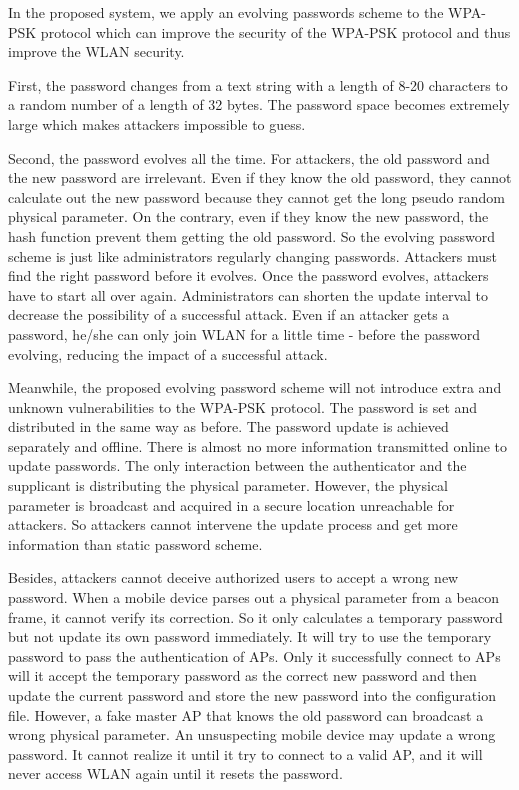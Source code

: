In the proposed system, we apply an evolving passwords scheme to the WPA-PSK protocol which can improve the security of the WPA-PSK protocol and thus improve the WLAN security. 


First, the password changes from a text string with a length of 8-20 characters to a random number of a length of 32 bytes. The password space becomes extremely large which makes attackers impossible to guess. 


Second, the password evolves all the time. For attackers, the old password and the new password are irrelevant. Even if they know the old password, they cannot calculate out the new password because they cannot get the long pseudo random physical parameter. On the contrary, even if they know the new password, the hash function prevent them getting the old password. So the evolving password scheme is just like administrators regularly changing passwords. Attackers must find the right password before it evolves. Once the password evolves, attackers have to start all over again. Administrators can shorten the update interval to decrease the possibility of a successful attack. Even if an attacker gets a password, he/she can only join WLAN for a little time - before the password evolving, reducing the impact of a successful attack. 


Meanwhile, the proposed evolving password scheme will not introduce extra and unknown vulnerabilities to the WPA-PSK protocol. The password is set and distributed in the same way as before. The password update is achieved separately and offline. There is almost no more information transmitted online to update passwords. The only interaction between the authenticator and the supplicant is distributing the physical parameter. However, the physical parameter is broadcast and acquired in a secure location unreachable for attackers. So attackers cannot intervene the update process and get more information than static password scheme. 


Besides, attackers cannot deceive authorized users to accept a wrong new password. When a mobile device parses out a physical parameter from a beacon frame, it cannot verify its correction. So it only calculates a temporary password but not update its own password immediately. It will try to use the temporary password to pass the authentication of APs. Only it successfully connect to APs will it accept the temporary password as the correct new password and then update the current password and store the new password into the configuration file. However, a fake master AP that knows the old password can broadcast a wrong physical parameter. An unsuspecting mobile device may update a wrong password. It cannot realize it until it try to connect to a valid AP, and it will never access WLAN again until it resets the password. 
